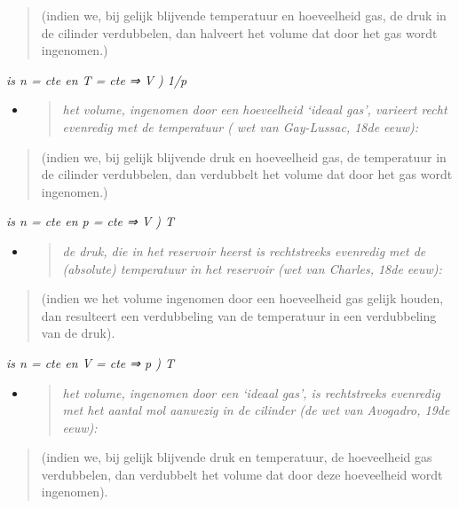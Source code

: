\documentclass[]{article}
\begin{document}
\begin{quote}
(indien we, bij gelijk blijvende temperatuur en hoeveelheid gas, de druk
in de cilinder verdubbelen, dan halveert het volume dat door het gas
wordt ingenomen.)
\end{quote}

\emph{is n = cte en T = cte ⇒ V ) 1/p}

\begin{itemize}
\item
  \begin{quote}
  \emph{het volume, ingenomen door een hoeveelheid `ideaal gas',
  varieert recht evenredig met de temperatuur ( wet van Gay-Lussac, 18de
  eeuw):}
  \end{quote}
\end{itemize}

\begin{quote}
(indien we, bij gelijk blijvende druk en hoeveelheid gas, de temperatuur
in de cilinder verdubbelen, dan verdubbelt het volume dat door het gas
wordt ingenomen.)
\end{quote}

\emph{is n = cte en p = cte ⇒ V ) T}

\begin{itemize}
\item
  \begin{quote}
  \emph{de druk, die in het reservoir heerst is rechtstreeks evenredig
  met de (absolute) temperatuur in het reservoir (wet van Charles, 18de
  eeuw):}
  \end{quote}
\end{itemize}

\begin{quote}
(indien we het volume ingenomen door een hoeveelheid gas gelijk houden,
dan resulteert een verdubbeling van de temperatuur in een verdubbeling
van de druk).
\end{quote}

\emph{is n = cte en V = cte ⇒ p ) T}

\begin{itemize}
\item
  \begin{quote}
  \emph{het volume, ingenomen door een `ideaal gas', is rechtstreeks
  evenredig met het aantal mol aanwezig in de cilinder (de wet van
  Avogadro, 19de eeuw):}
  \end{quote}
\end{itemize}

\begin{quote}
(indien we, bij gelijk blijvende druk en temperatuur, de hoeveelheid gas
verdubbelen, dan verdubbelt het volume dat door deze hoeveelheid wordt
ingenomen).
\end{quote}
\end{document}
